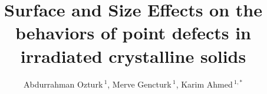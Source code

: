 \documentclass[utf8]{frontiersSCNS} %
\def\firstAuthorLast{Ozturk {et~al.}} %
\def\Authors{Abdurrahman Ozturk\,$^{1}$, Merve Gencturk\,$^{1}$, Karim Ahmed\,$^{1,*}$}
\begin{document}
\onecolumn
{}

\title[]{Surface and Size Effects on the behaviors of point defects in irradiated crystalline solids} 

\author[\firstAuthorLast ]{\Authors} %
\address{} %
\correspondance{} %

\extraAuth{}%

\maketitle
\end{document}
